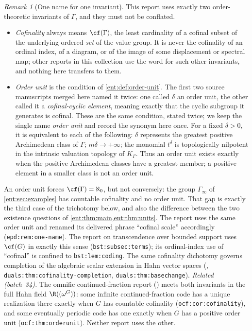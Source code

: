 \documentclass[11pt]{article}
\theoremstyle{plain}
\theoremstyle{plain}
\theoremstyle{plain}
\theoremstyle{definition}
\theoremstyle{definition}
\theoremstyle{definition}
\theoremstyle{definition}
\theoremstyle{remark}
\newtheorem{remark}[remark]{Remark}
\newcommand{\K}{K_\Gamma}\newcommand{\KD}{K_\Delta}
\begin{document}
\begin{remark}[One name for one invariant]\label{ent:rem:one-name}
This report uses exactly two order-theoretic invariants of $\Gamma$, and
they must not be conflated.
\begin{itemize}[leftmargin=1.4em]
\item \emph{Cofinality} always means $\cf(\Gamma)$, the least cardinality of
a cofinal subset of the underlying ordered \emph{set} of the value group. It
is never the cofinality of an ordinal index, of a diagram, or of the image of
some displacement or spectral map; other reports in this collection use the
word for such other invariants, and nothing here transfers to them.
\item \emph{Order unit} is the condition of
\cref{ent:def:order-unit}. The first two source manuscripts merged here named it
twice: one called $\delta$ an order unit, the other called it a
\emph{cofinal-cyclic element}, meaning exactly that the cyclic subgroup it
generates is cofinal. These are the same condition, stated twice; we keep
the single name \emph{order unit} and record the synonym here once.
For a fixed $\delta>0$, it is equivalent to each of the following:
$\delta$ represents the greatest positive Archimedean class of $\Gamma$;
$m\delta\to+\infty$; the monomial
$t^\delta$ is topologically nilpotent in the intrinsic valuation topology of
$\K$. Thus an order unit exists exactly when the positive Archimedean
classes have a greatest member; a positive element in a smaller class is
not an order unit.
\end{itemize}
An order unit forces $\cf(\Gamma)=\aleph_0$, but not conversely: the group
$\Gamma_\infty$ of \cref{ent:sec:examples} has countable cofinality and no
order unit. That gap is exactly the third case of the trichotomy below, and
also the difference between the two existence questions of
\cref{ent:thm:main,ent:thm:units}. The report
 uses the same order unit
and renamed its delivered phrase ``cofinal scale'' accordingly
(\texttt{epd:rem:one-name}). The report on transcendence over bounded support uses $\cf(G)$ in
exactly this sense (\texttt{bst:subsec:terms}); its ordinal-index use of
``cofinal'' is confined to \texttt{bst:lem:coding}. The same cofinality
dichotomy governs completion of the algebraic scalar extension in Hahn vector
spaces (,
\texttt{duals:thm:cofinality-completion}, \texttt{duals:thm:basechange}).
\emph{Related (batch~34).} The omnific continued-fraction report
() meets both invariants in
the full Hahn field $\R((\omega^G))$: some infinite continued-fraction code
has a unique realization there exactly when $G$ has countable cofinality
(\texttt{ocf:cor:cofinality}), and some eventually periodic code has one
exactly when $G$ has a positive order unit (\texttt{ocf:thm:orderunit}).
Neither report uses the other.
\end{remark}
\end{document}
